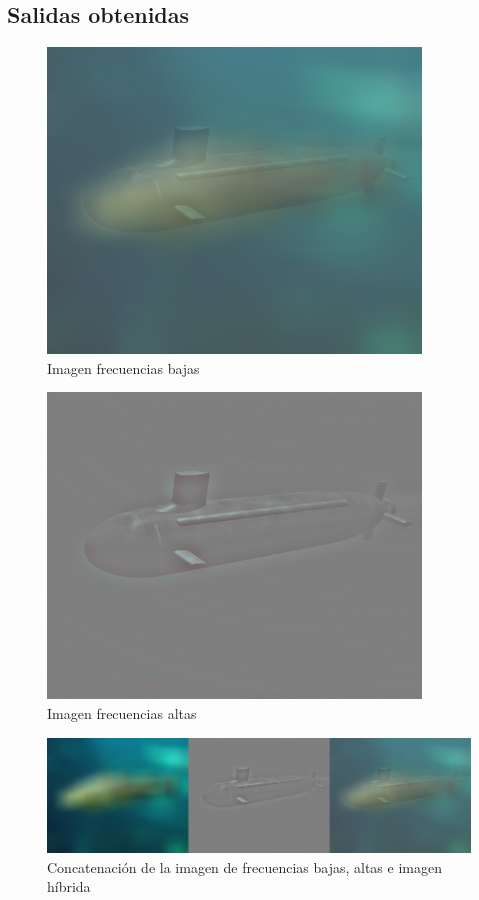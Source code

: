 \subsection{Salidas obtenidas}

\begin{figure}[H]
	\centering
	\includegraphics[width=0.6\linewidth]{b2}
	\caption{Imagen frecuencias bajas}
	\label{fig:freq_altasB}
\end{figure}

\begin{figure}[H]
	\centering
	\includegraphics[width=0.6\linewidth]{b1}
	\caption{Imagen frecuencias altas }
	\label{fig:freq_altasB}
\end{figure}

\begin{figure}[H]
	\centering
	\includegraphics[width=1\linewidth]{b3}
	\caption{Concatenación de la imagen de frecuencias bajas, altas e imagen híbrida}
	\label{fig:freq_altasB}
\end{figure}

